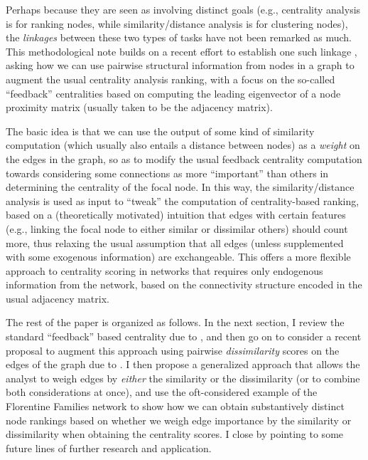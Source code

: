 \documentclass[12pt]{article}
\begin{document}
Perhaps because they are seen as involving distinct goals (e.g., centrality analysis is for ranking nodes, while similarity/distance analysis is for clustering nodes), the \textit{linkages} between these two types of tasks have not been remarked as much. This methodological note builds on a recent effort to establish one such linkage \citep{alvarez-socorro2015eigencentrality-66c}, asking how we can use pairwise structural information from nodes in a graph to augment the usual centrality analysis ranking, with a focus on the so-called ``feedback'' centralities based on computing the leading eigenvector of a node proximity matrix (usually taken to be the adjacency matrix). 

The basic idea is that we can use the output of some kind of similarity computation (which usually also entails a distance between nodes) as a \textit{weight} on the edges in the graph, so as to modify the usual feedback centrality computation towards considering some connections as more ``important'' than others in determining the centrality of the focal node. In this way, the similarity/distance analysis is used as input to ``tweak'' the computation of centrality-based ranking, based on a (theoretically motivated) intuition that edges with certain features (e.g., linking the focal node to either similar or dissimilar others) should count more, thus relaxing the usual assumption that all edges (unless supplemented with some exogenous information) are exchangeable. This offers a more flexible approach to centrality scoring in networks that requires only endogenous information from the network, based on the connectivity structure encoded in the usual adjacency matrix. 

The rest of the paper is organized as follows. In the next section, I review the standard ``feedback'' based centrality due to \citet{bonacich1972factoring-03e}, and then go on to consider a recent proposal to augment this approach using pairwise \textit{dissimilarity} scores on the edges of the graph due to \citet{alvarez-socorro2015eigencentrality-66c}. I then propose a generalized approach that allows the analyst to weigh edges by \textit{either} the similarity or the dissimilarity (or to combine both considerations at once), and use the oft-considered example of the Florentine Families network \citep{padgett1993robust-4cc} to show how we can obtain substantively distinct node rankings based on whether we weigh edge importance by the similarity or dissimilarity when obtaining the centrality scores. I close by pointing to some future lines of further research and application. 
\end{document}
